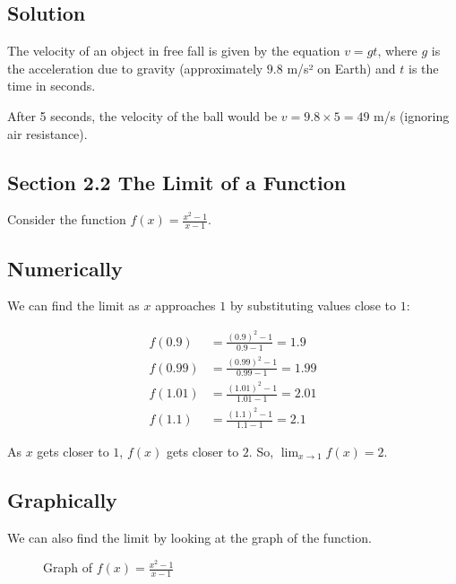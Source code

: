 \documentclass{article}
\begin{document}
\subsection{Solution}

The velocity of an object in free fall is given by the equation $v = gt$, where $g$ is the acceleration due to gravity (approximately $9.8$ m/s² on Earth) and $t$ is the time in seconds.

After 5 seconds, the velocity of the ball would be $v = 9.8 \times 5 = 49$ m/s (ignoring air resistance).

\subsection{Section 2.2 The Limit of a Function}

Consider the function $f(x) = \frac{x^2 - 1}{x - 1}$.

\subsection{Numerically}

We can find the limit as $x$ approaches $1$ by substituting values close to $1$:

\begin{align*}
f(0.9) &= \frac{(0.9)^2 - 1}{0.9 - 1} = 1.9 \\
f(0.99) &= \frac{(0.99)^2 - 1}{0.99 - 1} = 1.99 \\
f(1.01) &= \frac{(1.01)^2 - 1}{1.01 - 1} = 2.01 \\
f(1.1) &= \frac{(1.1)^2 - 1}{1.1 - 1} = 2.1
\end{align*}

As $x$ gets closer to $1$, $f(x)$ gets closer to $2$. So, $\lim_{x\to 1} f(x) = 2$.

\subsection{Graphically}

We can also find the limit by looking at the graph of the function.

\begin{figure}[h]
\centering
{}
\caption{Graph of $f(x) = \frac{x^2 - 1}{x - 1}$}
\end{figure}
\end{document}

